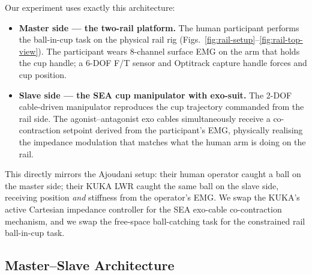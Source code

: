 \documentclass[11pt, a4paper]{article}
\begin{document}
Our experiment uses exactly this architecture:
\begin{itemize}[nosep]
  \item \textbf{Master side --- the two-rail platform.}
        The human participant performs the ball-in-cup task on the physical
        rail rig (Figs.~\ref{fig:rail-setup}--\ref{fig:rail-top-view}).
        The participant wears 8-channel surface EMG on the arm that holds
        the cup handle; a 6-DOF F/T sensor and Optitrack capture handle
        forces and cup position.
  \item \textbf{Slave side --- the SEA cup manipulator with exo-suit.}
        The 2-DOF cable-driven manipulator reproduces the cup trajectory
        commanded from the rail side.  The agonist--antagonist exo cables
        simultaneously receive a co-contraction setpoint derived from the
        participant's EMG, physically realising the impedance modulation
        that matches what the human arm is doing on the rail.
\end{itemize}

This directly mirrors the Ajoudani setup: their human operator caught a ball
on the master side; their KUKA LWR caught the same ball on the slave side,
receiving position \emph{and} stiffness from the operator's EMG. We swap
the KUKA's active Cartesian impedance controller for the SEA exo-cable
co-contraction mechanism, and we swap the free-space ball-catching task for
the constrained rail ball-in-cup task.

\subsection{Master--Slave Architecture}
\end{document}
